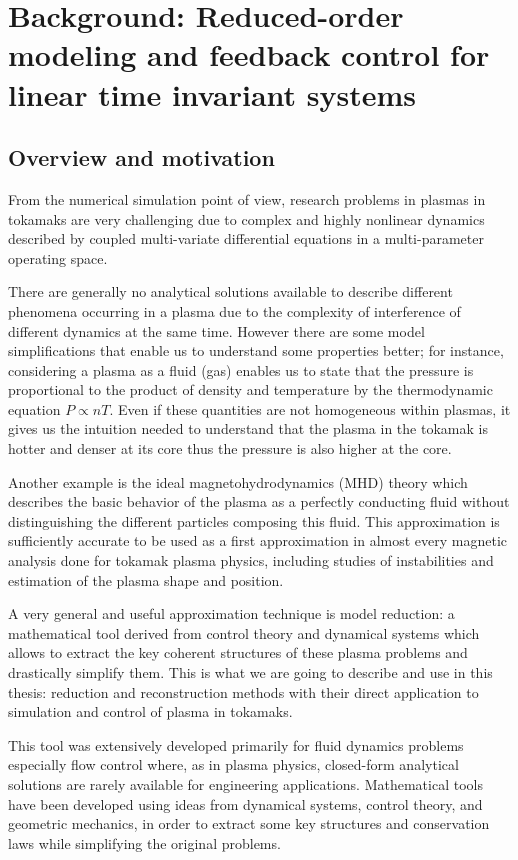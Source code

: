 \documentclass[12pt,lot, lof]{puthesis}
\begin{document}
\chapter{Background: Reduced-order modeling  and feedback control for linear time invariant systems}
\label{chapitre2}

\section{Overview and motivation}

From the numerical simulation point of view, research problems in plasmas in tokamaks are very challenging due to complex and highly nonlinear dynamics described by coupled multi-variate differential equations in a multi-parameter operating space.

There are generally no analytical solutions available to describe different phenomena occurring in a plasma due to the complexity of interference of different dynamics at the same time. However there are some model simplifications that enable us to understand some properties better; for instance, considering a plasma as a fluid (gas) enables us to state that the pressure is proportional to the product of density and temperature by the thermodynamic equation $P \propto n T$. Even if these quantities are not homogeneous within plasmas, it gives us the intuition needed to understand that the plasma in the tokamak is hotter and denser at its core thus the pressure is also higher at the core.

Another example is the ideal magnetohydrodynamics (MHD) theory which describes the basic behavior of the plasma as a perfectly conducting fluid without distinguishing the different particles composing this fluid. This approximation is sufficiently accurate to be used as a first approximation in almost every magnetic analysis done for tokamak plasma physics, including studies of instabilities and estimation of the plasma shape and position.

A very general and useful approximation technique is model reduction: a mathematical tool derived from control theory and dynamical systems which allows to extract the key coherent structures of these plasma problems and drastically simplify them. This is what we are going to describe and use in this thesis: reduction and reconstruction methods with their direct application to simulation and control of plasma in tokamaks.

This tool was extensively developed primarily for fluid dynamics problems especially flow control where, as in plasma physics, closed-form analytical solutions are rarely available for engineering applications. Mathematical tools have been developed using ideas from dynamical systems, control theory, and geometric mechanics, in order to extract some key structures and conservation laws while simplifying the original problems.
\end{document}
